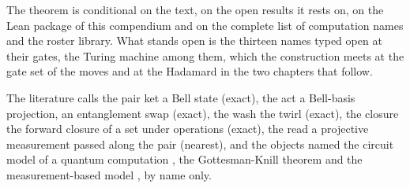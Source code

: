 The theorem is conditional on the text, on the open results it rests on, on the Lean package of this compendium and on the complete list of computation names and the roster library. What stands open is the thirteen names typed open at their gates, the Turing machine among them, which the construction meets at the gate set of the moves and at the Hadamard in the two chapters that follow.
\begin{chbridge}
The literature calls the pair ket a Bell state (exact), the act a Bell-basis projection, an entanglement swap (exact), the wash the twirl (exact), the closure the forward closure of a set under operations (exact), the read a projective measurement passed along the pair (nearest), and the objects named the circuit model of a quantum computation \cite{Nielsen2000}, the Gottesman-Knill theorem \cite{Gottesman1998} and the measurement-based model \cite{Raussendorf2001}, by name only.
\end{chbridge}
